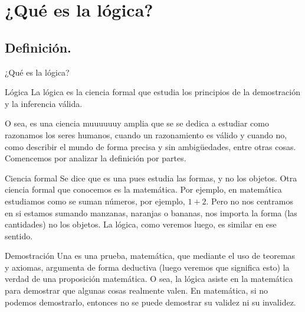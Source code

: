 \section{¿Qué es la lógica?}
\subsection{Definición.}


\begin{frame}{¿Qué es la lógica?}
  \begin{block}{Lógica}
    La lógica es la ciencia formal que estudia los principios de la
    demostración y la inferencia válida.
  \end{block}
  \jump
  O sea, es una ciencia muuuuuuy amplia que se se dedica a estudiar como
  razonamos los seres humanos, cuando un razonamiento es válido y cuando no,
  como describir el mundo de forma precisa y sin ambigüedades, entre otras
  cosas.
  \jump
  Comencemos por analizar la definición por partes.
\end{frame}


\begin{frame}{Ciencia formal}
  Se dice que es una  pues estudia las formas, y no los
  objetos.
  \jump
  Otra ciencia formal que conocemos es la matemática.
  \jump
  Por ejemplo, en matemática estudiamos como se suman números, por ejemplo,
  $1+2$. Pero no nos centramos en si estamos sumando manzanas, naranjas o
  bananas, nos importa la forma (las cantidades) no los objetos.
  \jump
  La lógica, como veremos luego, es similar en ese sentido.
\end{frame}


\begin{frame}{Demostración}
  Una  es una prueba, matemática, que mediante el uso
  de teoremas y axiomas, argumenta de forma deductiva (luego veremos que
  significa esto) la verdad de una proposición matemática.
  \jump
  O sea, la lógica asiste en la matemática para demostrar que algunas cosas
  realmente valen.
  \jump
  En matemática, si no podemos demostrarlo, entonces no se puede demostrar su
  validez ni su invalidez.
\end{frame}

